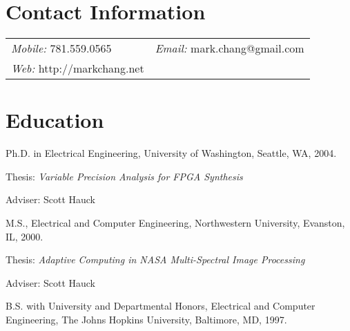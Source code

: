 \documentclass[line]{res}
\newenvironment{list1}{
  \begin{list}{\ding{113}}{%
      \setlength{\itemsep}{0in}
      \setlength{\parsep}{0in} \setlength{\parskip}{0in}
      \setlength{\topsep}{0in} \setlength{\partopsep}{0in} 
      \setlength{\leftmargin}{0.17in}}}{\end{list}}
\begin{document}

\begin{resume}
	
	\section{\sc Contact Information} \vspace{0.05in} 
	\begin{tabular}
		{@{}p{3in}p{2.5in}} {\em Mobile:} 781.559.0565 & {\em Email:} mark.chang@gmail.com \\
		{\em Web:} http://markchang.net & \\
	\end{tabular}
	
	\section{\sc Education} Ph.D. in Electrical Engineering, University of Washington, Seattle, WA, 2004.\\
	\vspace*{-.1in} 
	\begin{list1}
		\item[] Thesis: {\em Variable Precision Analysis for FPGA Synthesis} 
		\item[] Adviser: Scott Hauck 
	\end{list1}
	
	M.S., Electrical and Computer Engineering, Northwestern University, Evanston, IL, 2000.\\
	\vspace*{-.1in} 
	\begin{list1}
		\item[] Thesis: {\em Adaptive Computing in NASA Multi-Spectral Image Processing} 
		\item[] Adviser: Scott Hauck 
	\end{list1}
	
	B.S. with University and Departmental Honors, Electrical and Computer Engineering, The Johns Hopkins University, Baltimore, MD, 1997.
	

\end{resume}
\end{document}

